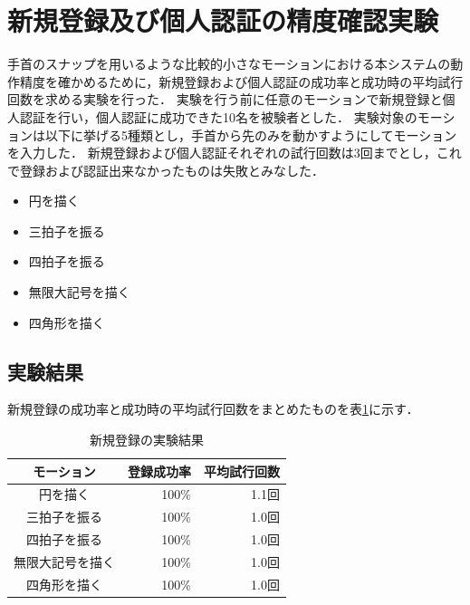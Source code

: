 \documentclass[11pt]{jreport}
\begin{document}
    \section{新規登録及び個人認証の精度確認実験}
    \label{previousExp}
    手首のスナップを用いるような比較的小さなモーションにおける本システムの動作精度を確かめるために，新規登録および個人認証の成功率と成功時の平均試行回数を求める実験を行った．
    実験を行う前に任意のモーションで新規登録と個人認証を行い，個人認証に成功できた10名を被験者とした．
    実験対象のモーションは以下に挙げる5種類とし，手首から先のみを動かすようにしてモーションを入力した．
    新規登録および個人認証それぞれの試行回数は3回までとし，これで登録および認証出来なかったものは失敗とみなした．

    \begin{itemize}
        \item 円を描く
        \item 三拍子を振る
        \item 四拍子を振る
        \item 無限大記号を描く
        \item 四角形を描く
    \end{itemize}

    \subsection{実験結果}
    新規登録の成功率と成功時の平均試行回数をまとめたものを表\ref{regResult}に示す．

    \begin{table}[htb]
        \begin{center}
            \caption{新規登録の実験結果}
            \label{regResult}
            \begin{tabular}{|c|r|r|} \hline
                モーション & 登録成功率 & 平均試行回数 \\ \hline \hline
                円を描く & 100\% & 1.1回 \\ \hline
                三拍子を振る & 100\% & 1.0回 \\ \hline
                四拍子を振る & 100\% & 1.0回 \\ \hline
                無限大記号を描く & 100\% & 1.0回 \\ \hline
                四角形を描く & 100\% & 1.0回 \\ \hline
            \end{tabular}
        \end{center}
    \end{table}
\end{document}
